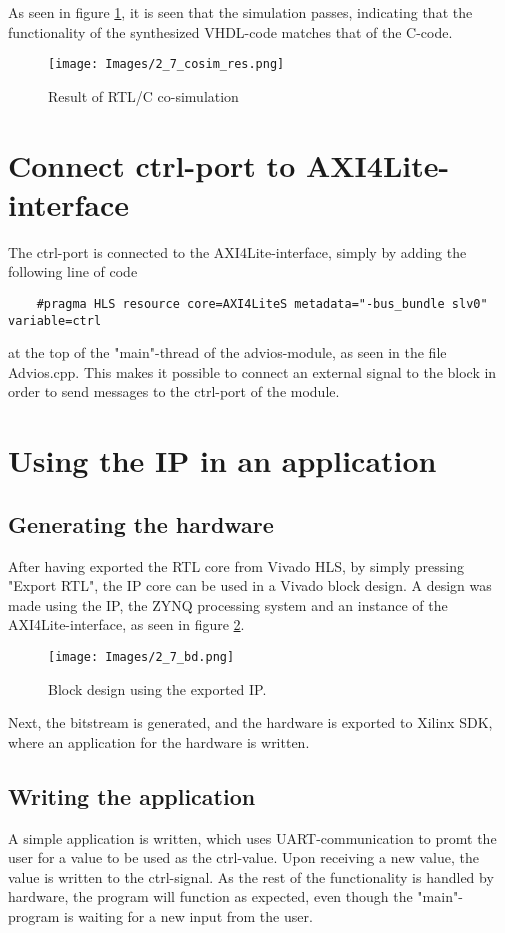 As seen in figure \ref{fig:7_cosim_res}, it is seen that the simulation passes, indicating that the functionality of the synthesized VHDL-code matches that of the C-code.

\begin{figure}[H]
	\centering
	{\texttt{[image: Images/2\_7\_cosim\_res.png]}}\\[0.5cm]
	\label{fig:7_cosim_res}
	\caption{Result of RTL/C co-simulation}
\end{figure}

\section{Connect ctrl-port to AXI4Lite-interface}
The ctrl-port is connected to the AXI4Lite-interface, simply by adding the following line of code

\begin{lstlisting}
	#pragma HLS resource core=AXI4LiteS metadata="-bus_bundle slv0" variable=ctrl
\end{lstlisting}
at the top of the "main"-thread of the advios-module, as seen in the file Advios.cpp.
This makes it possible to connect an external signal to the block in order to send messages to the ctrl-port of the module.

\section{Using the IP in an application}
\subsection{Generating the hardware}
After having exported the RTL core from Vivado HLS, by simply pressing "Export RTL", the IP core can be used in a Vivado block design. A design was made using the IP, the ZYNQ processing system and an instance of the AXI4Lite-interface, as seen in figure \ref{fig:2_7_BD}.

\begin{figure}[H]
\centering
{\texttt{[image: Images/2\_7\_bd.png]}}\\[0.5cm]
\label{fig:2_7_BD}
\caption{Block design using the exported IP.}
\end{figure}

Next, the bitstream is generated, and the hardware is exported to Xilinx SDK, where an application for the hardware is written.

\subsection{Writing the application}
A simple application is written, which uses UART-communication to promt the user for a value to be used as the ctrl-value. Upon receiving a new value, the value is written to the ctrl-signal. As the rest of the functionality is handled by hardware, the program will function as expected, even though the "main"-program is waiting for a new input from the user.

